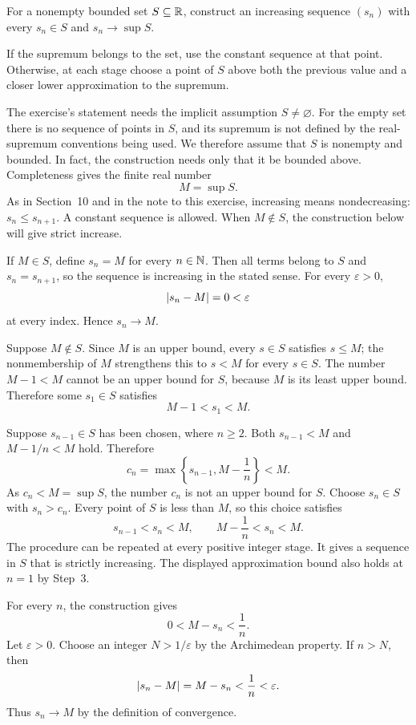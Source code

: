 \goal For a nonempty bounded set $S\subseteq\mathbb{R}$, construct an
increasing sequence $(s_n)$ with every $s_n\in S$ and
$s_n\to\sup S$.

\idea If the supremum belongs to the set, use the constant sequence
at that point. Otherwise, at each stage choose a point of $S$ above
both the previous value and a closer lower approximation to the
supremum.

The exercise's statement needs the implicit assumption $S\ne\varnothing$.
For the empty set there is no sequence of points in $S$, and its
supremum is not defined by the real-supremum conventions being used.
We therefore assume that $S$ is nonempty and bounded.
In fact, the construction needs only that it be bounded above.
Completeness gives the finite real number
\[
 M=\sup S.
\]
As in Section~10 and in the note to this exercise, increasing means
nondecreasing: $s_n\le s_{n+1}$. A constant sequence is allowed.
When $M\notin S$, the construction below will give strict increase.

If $M\in S$, define $s_n=M$ for every $n\in\mathbb{N}$.
Then all terms belong to $S$ and $s_n=s_{n+1}$, so the sequence
is increasing in the stated sense. For every $\varepsilon>0$,
\[
 \left|s_n-M\right|=0<\varepsilon
\]
at every index. Hence $s_n\to M$.

Suppose $M\notin S$. Since $M$ is an upper bound, every $s\in S$
satisfies $s\le M$; the nonmembership of $M$ strengthens this to
$s<M$ for every $s\in S$.
The number $M-1<M$ cannot be an upper bound for $S$, because
$M$ is its least upper bound. Therefore some $s_1\in S$ satisfies
\[
 M-1<s_1<M.
\]

Suppose $s_{n-1}\in S$ has been chosen, where $n\ge2$.
Both $s_{n-1}<M$ and $M-1/n<M$ hold. Therefore
\[
 c_n=\max\left\{s_{n-1},M-\frac1n\right\}<M.
\]
As $c_n<M=\sup S$, the number $c_n$ is not an upper bound for $S$.
Choose $s_n\in S$ with $s_n>c_n$.
Every point of $S$ is less than $M$, so this choice satisfies
\[
 s_{n-1}<s_n<M,
 \qquad M-\frac1n<s_n<M.
\]
The procedure can be repeated at every positive integer stage.
It gives a sequence in $S$ that is strictly increasing.
The displayed approximation bound also holds at $n=1$ by Step~3.

For every $n$, the construction gives
\[
 0<M-s_n<\frac1n.
\]
Let $\varepsilon>0$. Choose an integer $N>1/\varepsilon$ by the
Archimedean property. If $n>N$, then
\[
 \left|s_n-M\right|=M-s_n<\frac1n<\varepsilon.
\]
Thus $s_n\to M$ by the definition of convergence.

